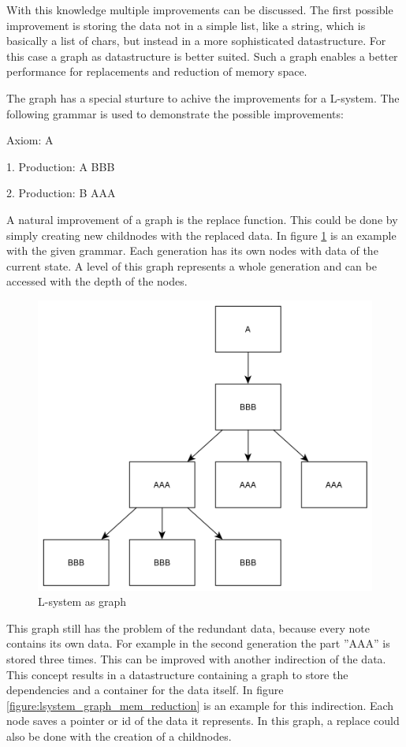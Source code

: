 \documentclass[english]{cpp-hmwk}
\begin{document}
\medskip
\noindent With this knowledge multiple improvements can be discussed. The first possible improvement is storing the data not in a simple list, like a string, which is basically a list of chars, but instead in a more sophisticated datastructure. For this case a graph as datastructure is better suited. Such a graph enables a better performance for replacements and reduction of memory space.

\medskip
\noindent The graph has a special sturture to achive the improvements for a L-system. The following grammar is used to demonstrate the possible improvements:
 
Axiom: A

1. Production: A \rightarrow BBB

2. Production: B \rightarrow AAA

\medskip

\noindent A natural improvement of a graph is the replace function. This could be done by simply creating new childnodes with the replaced data. In figure \ref{figure:lsystem_graph} is an example with the given grammar. Each generation has its own nodes with data of the current state. A level of this graph represents a whole generation and can be accessed with the depth of the nodes.

\begin{figure}[h!]
	\centering
	\includegraphics[width=0.6\columnwidth]{../graphs/lsystem_graph_example.png}
	\caption{L-system as graph}
	\label{figure:lsystem_graph}
\end{figure}

\medskip

\noindent This graph still has the problem of the redundant data, because every note contains its own data. For example in the second generation the part ''AAA'' is stored three times. This can be improved with another indirection of the data. This concept results in a datastructure containing a graph to store the dependencies and a container for the data itself. In figure \ref{figure:lsystem_graph_mem_reduction} is an example for this indirection. Each node saves a pointer or id of the data it represents. In this graph, a replace could also be done with the creation of a childnodes.
\end{document}
